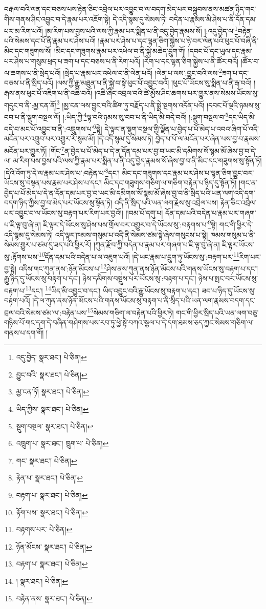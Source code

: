 བརྒལ་བའི་ལན་དང་བཅས་པས་རྟེན་ཅིང་འབྲེལ་པར་འབྱུང་བ་ལ་བདག་མེད་པར་བསྒྲུབས་ནས་མཚན་ཉིད་གང་གིས་གནས་ཤིང་འབྱུང་བ་དེ་རྣམ་པར་འཇོག་སྟེ། དེ་འདི་སྙམ་དུ་སེམས་ཏེ། བདེན་པ་རྣམས་མི་ཤེས་པ་ནི་དོན་དམ་པར་མ་རིག་པའོ། །མ་རིག་པས་བྱས་པའི་ལས་ཀྱི་རྣམ་པར་སྨིན་པ་ནི་འདུ་བྱེད་རྣམས་སོ། །:འདུ་བྱེད་ལ་\footnote{འདུ་བྱེད་  སྣར་ཐང་།  པེ་ཅིན། }བརྟེན་པའི་སེམས་དང་པོ་ནི་རྣམ་པར་ཤེས་པའོ། །རྣམ་པར་ཤེས་པ་དང་ལྷན་ཅིག་སྐྱེས་པ་ཉེ་བར་ལེན་པའི་ཕུང་པོ་བཞི་ནི་མིང་དང་གཟུགས་སོ། །མིང་དང་གཟུགས་རྣམ་པར་འཕེལ་བ་ནི་སྐྱེ་མཆེད་དྲུག་གོ། །དབང་པོ་དང་ཡུལ་དང་རྣམ་པར་ཤེས་པ་གསུམ་ཕྲད་པ་ཟག་པ་དང་བཅས་པ་ནི་རེག་པའོ། །རེག་པ་དང་ལྷན་ཅིག་སྐྱེས་པ་ནི་ཚོར་བའོ། །ཚོར་བ་ལ་ཆགས་པ་ནི་སྲེད་པའོ། །སྲེད་པ་རྣམ་པར་འཕེལ་བ་ནི་ལེན་པའོ། །ལེན་པ་ལས་:བྱུང་བའི་ལས་\footnote{བྱུང་བའི་  སྣར་ཐང་།  པེ་ཅིན། }ཟག་པ་དང་བཅས་པ་ནི་སྲིད་པའོ། །ལས་ཀྱི་རྒྱུ་མཐུན་པ་ནི་སྐྱེ་བ་སྟེ་ཕུང་པོ་འབྱུང་བའོ། །ཕུང་པོ་ཡོངས་སུ་སྨིན་པ་ནི་རྒ་བའོ། །རྒས་ནས་ཕུང་པོ་འཇིག་པ་ནི་འཆི་བའོ། །འཆི་ཞིང་འབྲལ་བའི་ཚེ་མྱོས་ཤིང་ཆགས་པར་གྱུར་ནས་སེམས་ཡོངས་སུ་གདུང་བ་ནི་:མྱ་ངན་ནོ།\footnote{མྱ་ངན་ཏོ།  སྣར་ཐང་།  པེ་ཅིན། } །མྱ་ངན་ལས་བྱུང་བའི་ཚིག་ཏུ་བརྗོད་པ་ནི་སྨྲེ་སྔགས་འདོན་པའོ། །དབང་པོ་ལྔའི་ཉམས་སུ་བབ་པ་ནི་སྡུག་བསྔལ་ལོ། །:ཡིད་ཀྱི་\footnote{ཡིད་ཀྱིས་  སྣར་ཐང་།  པེ་ཅིན། }ལྟ་བའི་ཉམས་སུ་བབ་པ་ནི་ཡིད་མི་བདེ་བའོ། །:སྡུག་བསྔལ་བ་\footnote{སྡུག་བསྔལ་  སྣར་ཐང་།  པེ་ཅིན། }དང་ཡིད་མི་བདེ་བ་མང་པོ་འབྱུང་བ་ནི་:འཁྲུགས་པ་\footnote{འཁྲུག་པ་  སྣར་ཐང་། ཁྲུག་པ་  པེ་ཅིན། }སྟེ། དེ་ལྟར་ན་སྡུག་བསྔལ་གྱི་ལྗོན་པ་བྱེད་པ་པོ་མེད་པ་འབའ་ཞིག་པོ་འདི་མངོན་པར་འགྲུབ་པར་འགྱུར་རོ་སྙམ་མོ། །དེ་འདི་སྙམ་དུ་སེམས་ཏེ། བྱེད་པ་པོ་ལ་མངོན་པར་ཞེན་པས་བྱ་བ་རྣམས་མངོན་པར་གྱུར་ཏོ། །གོང་\footnote{གང་  སྣར་ཐང་།  པེ་ཅིན། }ན་བྱེད་པ་པོ་མེད་པ་དེ་ན་དོན་དམ་པར་བྱ་བ་ཡང་མི་དམིགས་སོ་སྙམ་མོ་ཞེས་བྱ་བ་དེ་ལ། མ་རིག་པས་བྱས་པའི་ལས་ཀྱི་རྣམ་པར་སྨིན་པ་ནི་འདུ་བྱེད་རྣམས་སོ་ཞེས་བྱ་བ་ནི་མིང་དང་གཟུགས་སུ་སྟོན་ཏོ། །དེའི་འོག་ཏུ་དེ་ལ་རྣམ་པར་ཤེས་པ་:བརྟེན་པ་\footnote{རྟེན་པ་  སྣར་ཐང་།  པེ་ཅིན། }དང་། མིང་དང་གཟུགས་དང་རྣམ་པར་ཤེས་པ་ལྷན་ཅིག་བྱུང་བར་ཡོངས་སུ་བསྟན་པས་རྣམ་པར་ཤེས་པ་དང་། མིང་དང་གཟུགས་གཅིག་ལ་གཅིག་བརྟེན་པ་ཉིད་དུ་སྟོན་ཏོ། །གང་ན་བྱེད་པ་པོ་མེད་པ་དེ་ན་དོན་དམ་པར་བྱ་བ་ཡང་མི་དམིགས་སོ་སྙམ་མོ་ཞེས་བྱ་བ་ནི་སྲིད་པའི་ཡན་ལག་འདི་དག་བདག་ཉིད་ཀྱིས་བྱ་བ་མེད་པར་ཡོངས་སུ་སྟོན་ཏེ། འདི་ནི་སྲིད་པའི་ཡན་ལག་རྗེས་སུ་འབྲེལ་པས། རྟེན་ཅིང་འབྲེལ་པར་འབྱུང་བ་ལ་ཡོངས་སུ་བརྟག་པར་རིག་པར་བྱའོ།། །།བམ་པོ་དགུ་པ། དོན་དམ་པའི་བདེན་པ་རྣམ་པར་གཞག་པ་ཇི་ལྟ་བུ་ཞེ་ན། ཇི་ལྟར་དེ་ཡོངས་སུ་ཤེས་པས་གྲོལ་བར་འགྱུར་བ་དེ་ཡོངས་སུ་:བརྟགས་པ་\footnote{བརྟག་པ་  སྣར་ཐང་།  པེ་ཅིན། }སྟེ། གང་གི་ཕྱིར་དེ་འདི་སྙམ་དུ་སེམས་ཏེ། འདི་ལྟར་ཁམས་གསུམ་པ་འདི་ནི་སེམས་ཙམ་སྟེ་ཞེས་གསུངས་པ་སྟེ། ཁམས་གསུམ་པ་ནི་སེམས་གྱུར་པ་ཙམ་དུ་ཟད་པའི་ཕྱིར་རོ། །ཀུན་རྫོབ་ཀྱི་བདེན་པ་རྣམ་པར་གཞག་པ་ཇི་ལྟ་བུ་ཞེ་ན། ཇི་ལྟར་ཡོངས་སུ་:རྟོགས་པས་\footnote{རྟོག་པས་  སྣར་ཐང་།  པེ་ཅིན། }དོན་དམ་པའི་བདེན་པ་ལ་འཇུག་པའོ། །དེ་ཡང་རྣམ་པ་དྲུག་ཏུ་ཡོངས་སུ་:བརྟག་པར་\footnote{བརྟགས་པར་  པེ་ཅིན། }རིག་པར་བྱ་སྟེ། འདིས་གང་ཀུན་ནས་:ཉོན་མོངས་པ་\footnote{ཉོན་མོངས་  སྣར་ཐང་།  པེ་ཅིན། }ཤེས་ནས་ཀུན་ནས་ཉོན་མོངས་པའི་གནས་ཡོངས་སུ་བརྟག་པ་དང་། རྒྱུ་ཉིད་དུ་ཡོངས་སུ་བརྟག་པ་དང་། ཉེས་དམིགས་བསྡུས་པར་ཡོངས་སུ་:བརྟག་པ་དང་། ཉེས་པ་སྤང་བར་ཡོངས་སུ་བརྟག་པ་\footnote{བརྟག་པ་  སྣར་ཐང་།  པེ་ཅིན། }དང་། \footnote{།    སྣར་ཐང་།  པེ་ཅིན། }ཡིད་མི་འབྱུང་བ་དང་། ཡིད་འབྱུང་བའི་རྒྱུ་ཡོངས་སུ་བརྟག་པ་དང་། ཟབ་པ་ཉིད་དུ་ཡོངས་སུ་བརྟག་པའོ། །དེ་ལ་ཀུན་ནས་ཉོན་མོངས་པའི་གནས་ཡོངས་སུ་བརྟག་པ་ནི་སྲིད་པའི་ཡན་ལག་རྣམས་བདག་དང་བྲལ་བའི་སེམས་ཙམ་ལ་:བརྟེན་པས་\footnote{བརྟེན་ནས་  སྣར་ཐང་།  པེ་ཅིན། }སེམས་གཅིག་ལ་བརྟེན་པའི་ཕྱིར་ཏེ། གང་གི་ཕྱིར་སྲིད་པའི་ཡན་ལག་བཅུ་གཉིས་པོ་གང་དག་དེ་བཞིན་གཤེགས་པས་རབ་ཏུ་ཕྱེ་སྟེ་བཀའ་སྩལ་པ་དེ་དག་ཐམས་ཅད་ཀྱང་སེམས་གཅིག་ལ་གནས་པ་དག་གོ། །
